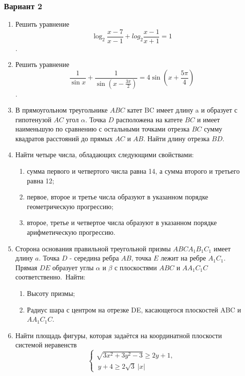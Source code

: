 \documentclass{article}
\begin{document}
\begin{paracol}{2}
\begin{flushleft}
\end{flushleft}
\switchcolumn
\begin{flushleft}
\subsubsection*{Вариант 2}
\begin{enumerate}
    \item Решить уравнение
    \[\log_2\frac{x-7}{x-1}+log_2\frac{x-1}{x+1}=1\].
    \item Решить уравнение
    \[\frac{1}{\sin x}+\frac{1}{\sin(x-\frac{3\pi}{2})}=4\sin(x+\frac{5\pi}{4})\].
    \item В прямоугольном треугольнике $ABC$ катет BC имеет длину a и образует с     гипотенузой $AC$ угол $\alpha$. Точка $D$ расположена на катете $BC$ и имеет     наименьшую по сравнению с остальными точками отрезка $BC$ сумму квадратов          расстояний до прямых $AC$ и $AB$. Найти длину отрезка $BD$.
    \item Найти четыре числа, обладающих следующими свойствами:
    \begin{enumerate} 
        \item сумма первого и четвертого числа равна 14, а сумма второго и третьего равна 12;
        \item первое, второе и третье числа образуют в указанном порядке геометрическую прогрессию;
        \item второе, третье и четвертое числа образуют в указанном порядке арифметическую прогрессию.
    \end{enumerate} 
    \item Сторона основания правильной треугольной призмы $ABCA_1B_1C_1$ имеет длину $a$. Точка $D$ - середина ребра $AB$, точка $E$ лежит на ребре $A_1C_1$. Прямая $DE$ образует углы $\alpha$ и $\beta$ с плоскостями $ABC$ и $AA_1C_1C$ соответственно.\ Найти:
    \begin{enumerate}
        \item Высоту призмы;
        \item Радиус шара с центром на отрезке DE, касающегося плоскостей ABC и $AA_1C_1C$.
    \end{enumerate}
    \item Найти площадь фигуры, которая задаётся на координатной плоскости системой неравенств
    \begin{equation*}
        \begin{cases}
        \sqrt{3x^2+3y^2-3}\geq 2y+1,\\
        \ y+4\geq 2\sqrt{3}\ \lvert x \rvert
        \end{cases}
    \end{equation*}
\end{enumerate}


\end{flushleft}
\end{paracol}
\end{document}
